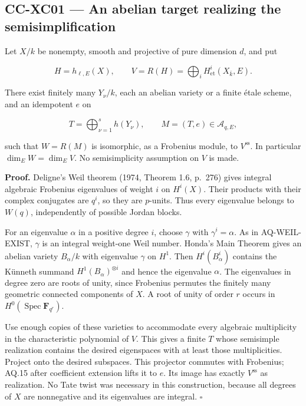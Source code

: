 \subsection{CC-XC01 --- An abelian target realizing the
semisimplification}\label{cc-xc01-an-abelian-target-realizing-the-semisimplification}

Let \(X/k\) be nonempty, smooth and projective of pure dimension \(d\),
and put

\[
 H=h_{\ell,E}(X),\qquad V=R(H)=\bigoplus_i H^i_{\mathrm{et}}(X_{\bar k},E).
\]

There exist finitely many \(Y_\nu/k\), each an abelian variety or a
finite étale scheme, and an idempotent \(e\) on

\[
 T=\bigoplus_{\nu=1}^s h(Y_\nu),\qquad M=(T,e)\in\mathcal A_{q,E},
\]

such that \(W=R(M)\) is isomorphic, as a Frobenius module, to
\(V^{\mathrm{ss}}\). In particular \(\dim_E W=\dim_E V\). No
semisimplicity assumption on \(V\) is made.

\textbf{Proof.} Deligne's Weil theorem (1974, Theorem 1.6, p.~276) gives
integral algebraic Frobenius eigenvalues of weight \(i\) on \(H^i(X)\).
Their products with their complex conjugates are \(q^i\), so they are
\(p\)-units. Thus every eigenvalue belongs to \(W(q)\), independently of
possible Jordan blocks.

For an eigenvalue \(\alpha\) in a positive degree \(i\), choose
\(\gamma\) with \(\gamma^i=\alpha\). As in AQ-WEIL-EXIST, \(\gamma\) is
an integral weight-one Weil number. Honda's Main Theorem gives an
abelian variety \(B_\alpha/k\) with eigenvalue \(\gamma\) on \(H^1\).
Then \(H^i(B_\alpha^i)\) contains the Künneth summand
\(H^1(B_\alpha)^{\otimes i}\) and hence the eigenvalue \(\alpha\). The
eigenvalues in degree zero are roots of unity, since Frobenius permutes
the finitely many geometric connected components of \(X\). A root of
unity of order \(r\) occurs in
\(H^0(\operatorname{Spec}\mathbf F_{q^r})\).

Use enough copies of these varieties to accommodate every algebraic
multiplicity in the characteristic polynomial of \(V\). This gives a
finite \(T\) whose semisimple realization contains the desired
eigenspaces with at least those multiplicities. Project onto the desired
subspaces. This projector commutes with Frobenius; AQ.15 after
coefficient extension lifts it to \(e\). Its image has exactly
\(V^{\mathrm{ss}}\) as realization. No Tate twist was necessary in this
construction, because all degrees of \(X\) are nonnegative and its
eigenvalues are integral. \(\square\)


